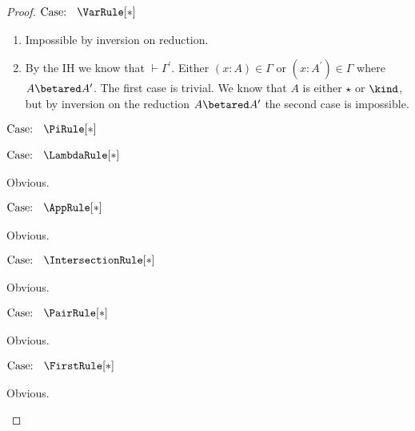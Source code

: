 \begin{proof}
$\text{Case: }\begin{array}{c} \VarRule[*] \end{array}$
\begin{proofcase}
    \begin{enumerate}
        \item Impossible by inversion on reduction.
        \item {
            By the IH we know that $\vdash \Gamma^\prime$.
            Either $(x : A) \in \Gamma$ or $(x : A^\prime) \in \Gamma$ where $A \betared A^\prime$.
            The first case is trivial.
            We know that $A$ is either $\star$ or $\kind$, but by inversion on the reduction $A \betared A^\prime$ the second case is impossible.        
        }
    \end{enumerate}
\end{proofcase}

$\text{Case: }\begin{array}{c} \PiRule[*] \end{array}$
\begin{proofcase}
    
\end{proofcase}

$\text{Case: }\begin{array}{c} \LambdaRule[*] \end{array}$
\begin{proofcase}
    Obvious.
\end{proofcase}

$\text{Case: }\begin{array}{c} \AppRule[*] \end{array}$
\begin{proofcase}
    Obvious.
\end{proofcase}

$\text{Case: }\begin{array}{c} \IntersectionRule[*] \end{array}$
\begin{proofcase}
    Obvious.
\end{proofcase}

$\text{Case: }\begin{array}{c} \PairRule[*] \end{array}$
\begin{proofcase}
    Obvious.
\end{proofcase}

$\text{Case: }\begin{array}{c} \FirstRule[*] \end{array}$
\begin{proofcase}
    Obvious.
\end{proofcase}


\end{proof}
